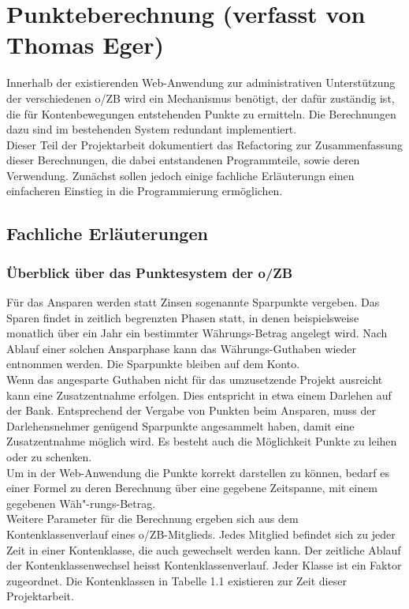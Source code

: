 \documentclass[12pt]{scrreprt}
\begin{document}
  
\chapter{Punkteberechnung (verfasst von Thomas Eger)}

Innerhalb der existierenden Web-Anwendung zur administrativen Unterstützung der verschiedenen o/ZB wird ein Mechanismus benötigt, der dafür zuständig ist, die für Kontenbewegungen entstehenden Punkte zu ermitteln. Die Berechnungen dazu sind im bestehenden System redundant implementiert. \\

Dieser Teil der Projektarbeit dokumentiert das Refactoring zur Zusammenfassung dieser Berechnungen, die dabei entstandenen Programmteile, sowie deren Verwendung. Zunächst sollen jedoch einige fachliche Erläuterungn einen einfacheren Einstieg in die Programmierung ermöglichen.  

\section{Fachliche Erläuterungen}

\subsection{Überblick über das Punktesystem der o/ZB}
Für das Ansparen werden statt Zinsen sogenannte Sparpunkte vergeben. Das Sparen findet in zeitlich begrenzten Phasen statt, in denen beispielsweise monatlich über ein Jahr ein bestimmter Währungs-Betrag angelegt wird. Nach Ablauf einer solchen Ansparphase kann das Währungs-Guthaben wieder entnommen werden. Die Sparpunkte bleiben auf dem Konto. \\

Wenn das angesparte Guthaben nicht für das umzusetzende Projekt ausreicht kann eine Zusatzentnahme erfolgen. Dies entspricht in etwa einem Darlehen auf der Bank. Entsprechend der Vergabe von Punkten beim Ansparen, muss der Darlehensnehmer genügend Sparpunkte angesammelt haben, damit eine Zusatzentnahme möglich wird. Es besteht auch die Möglichkeit Punkte zu leihen oder zu schenken. \\

Um in der Web-Anwendung die Punkte korrekt darstellen zu können, bedarf es einer Formel zu deren Berechnung über eine gegebene Zeitspanne, mit einem gegebenen Wäh{"-}rungs-Betrag. \\

Weitere Parameter für die Berechnung ergeben sich aus dem Kontenklassenverlauf eines o/ZB-Mitglieds. Jedes Mitglied befindet sich zu jeder Zeit in einer Kontenklasse, die auch gewechselt werden kann. Der zeitliche Ablauf der Kontenklassenwechsel heisst Kontenklassenverlauf. Jeder Klasse ist ein Faktor zugeordnet. Die Kontenklassen in Tabelle 1.1 existieren zur Zeit dieser Projektarbeit. \\
\end{document}
